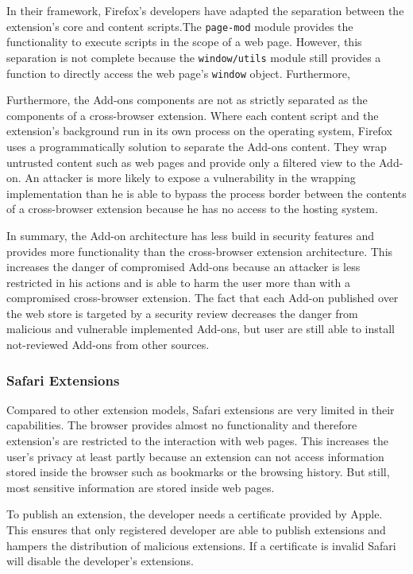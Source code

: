 	In their framework, Firefox's developers have adapted the separation between the extension's core and content scripts.The \texttt{page-mod} module provides the functionality to execute scripts in the scope of a web page. However, this separation is not complete because the \texttt{window/utils} module still provides a function to directly access the web page's \texttt{window} object. Furthermore, 
	
	Furthermore, the Add-ons components are not as strictly separated as the components of a cross-browser extension. Where each content script and the extension's background run in its own process on the operating system, Firefox uses a programmatically solution to separate the Add-ons content. They wrap untrusted content such as web pages and provide only a filtered view to the Add-on. An attacker is more likely to expose a vulnerability in the wrapping implementation than he is able to bypass the process border between the contents of a cross-browser extension because he has no access to the hosting system.
	
	In summary, the Add-on architecture has less build in security features and provides more functionality than the cross-browser extension architecture. This increases the danger of compromised Add-ons because an attacker is less restricted in his actions and is able to harm the user more than with a compromised cross-browser extension. The fact that each Add-on published over the web store is targeted by a security review decreases the danger from malicious and vulnerable implemented Add-ons,  but user are still able to install not-reviewed Add-ons from other sources. 
	
\subsubsection{Safari Extensions}

	Compared to other extension models, Safari extensions are very limited in their capabilities. The browser provides almost no functionality and therefore extension's are restricted to the interaction with web pages. This increases the user's privacy at least partly because an extension can not access information stored inside the browser such as bookmarks or the browsing history. But still, most sensitive information are stored inside web pages. 
	
	To publish an extension, the developer needs a certificate provided by Apple. This ensures that only registered developer are able to publish extensions and hampers the distribution of malicious extensions. If a certificate is invalid Safari will disable the developer's extensions.
	
